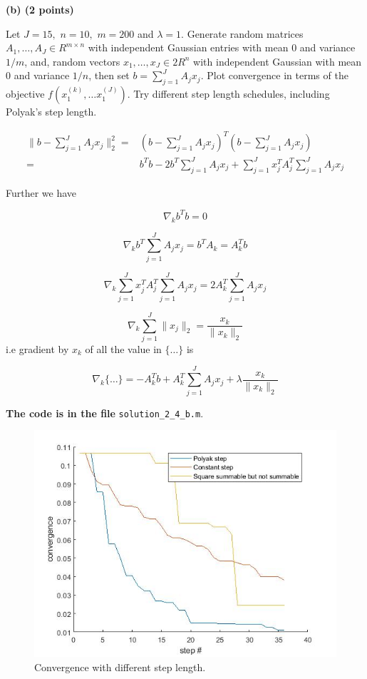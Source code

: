 \documentclass{article}
\begin{document}
\textbf{(b) (2 points)}

Let $J = 15,$ $n = 10,$ $m = 200$ and $\lambda = 1.$ Generate random matrices
$A_1, \dots , A_J \in R^{m\times n}$ with independent Gaussian entries with mean $ 0$ and variance
$1/m$, and, random vectors $x_1, \dots,  x_J \in 2 R^n$ with independent Gaussian with mean
$0$ and variance $1/n$, then set 
$b = \sum_{j = 1}^{J} A_j x_j.$
Plot convergence in terms of the
objective $f(x_1^{(k)}, \dots x_1^{(J)}).$ 
Try different step length schedules, including Polyak's
step length.

\begin{align*}
\lVert b - \sum_{j = 1}^{J} 
A_j x_j \rVert_2^2 = & 
(b - \sum_{j = 1}^{J} A_j x_j)^T (b - \sum_{j = 1}^{J} A_j x_j) \\ = &  
b^T b - 2 b^T \sum_{j = 1}^{J} A_j x_j + \sum_{j = 1}^{J} x_j^T A_j^T \sum_{j = 1}^{J} A_j x_j
\end{align*}

Further we have

$$
\nabla_k b^Tb = 0
$$

$$
\nabla_k b^T \sum_{j = 1}^{J} A_j x_j = 
b^T A_k = A_k^T b
$$

$$
\nabla_k \sum_{j = 1}^{J} x_j^T A_j^T \sum_{j = 1}^{J} A_j x_j 
= 2 A_k^T \sum_{j = 1}^{J} A_j x_j 
$$

$$
\nabla_k  \sum_{j = 1}^{J} \lVert x_j \rVert_2 = \frac{x_k} {\lVert x_k \rVert_2}
$$
i.e gradient by $x_k$ of all the value in 
$\bigg \{ \dots \bigg \}$ is

$$
\nabla_k \bigg \{ \dots \bigg \} = - A_k^T b + 
A_k^T \sum_{j = 1}^{J} A_j x_j  + 
\lambda \frac{x_k} {\lVert x_k \rVert_2}
$$



\textbf{The code is in the file} \verb|solution_2_4_b.m|.

\begin{figure}[H]
	\includegraphics[width=\linewidth]{2_4_2.jpg}
	\caption{Convergence with different step length.}
	\label{fig:2_4_2}
\end{figure}
\end{document}
